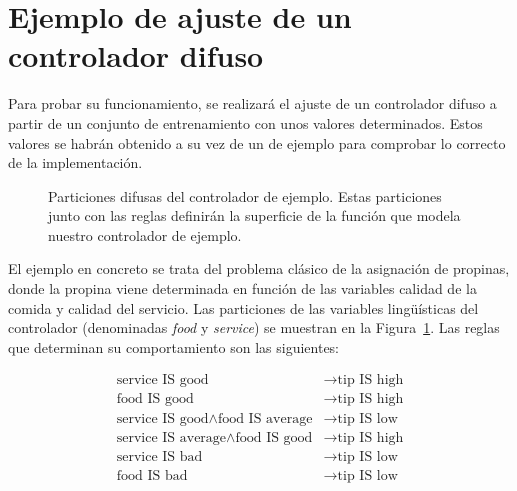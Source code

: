 \section{Ejemplo de ajuste de un controlador difuso}

Para probar su funcionamiento, se realizará el ajuste de un controlador difuso a partir de un conjunto de entrenamiento con unos valores determinados. Estos valores se habrán obtenido a su vez de un  de ejemplo para comprobar lo correcto de la implementación.

\begin{figure}[t]
	\centering
	\qquad
	\caption[Particiones difusas del controlador de ejemplo]{Particiones difusas del controlador de ejemplo. Estas particiones junto con las reglas definirán la superficie de la función que modela nuestro controlador de ejemplo.}
	\label{fig:real-tip-controller-vars}
\end{figure}


El ejemplo en concreto se trata del problema clásico de la asignación de propinas, donde la propina viene determinada en función de las variables calidad de la comida y calidad del servicio. Las particiones de las variables lingüísticas del controlador (denominadas \textit{food} y \textit{service}) se muestran en la Figura~\ref{fig:real-tip-controller-vars}. Las reglas que determinan su comportamiento son las siguientes:

\begin{align}
	\text{service IS good}                              &\rightarrow \text{tip IS high}\nonumber\\
	\text{food IS good}                                 &\rightarrow \text{tip IS high}\nonumber\\
	\text{service IS good} \land \text{food IS average} &\rightarrow \text{tip IS low}\nonumber\\
	\text{service IS average} \land \text{food IS good} &\rightarrow \text{tip IS high}\nonumber\\
	\text{service IS bad}                               &\rightarrow \text{tip IS low}\nonumber\\
	\text{food IS bad}                                  &\rightarrow \text{tip IS low}
\end{align}

